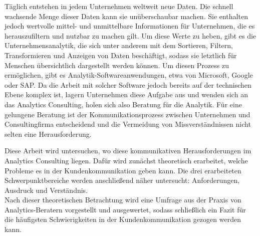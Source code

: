 \documentclass[../main.tex]{subfiles}
\begin{document}
Täglich entstehen in jedem Unternehmen weltweit neue Daten.
Die schnell wachsende Menge dieser Daten kann sie unüberschaubar machen.
Sie enthalten jedoch wertvolle mittel- und unmittelbare Informationen für Unternehmen, die es herauszufiltern und nutzbar zu machen gilt.
Um diese Werte zu heben, gibt es die Unternehmensanalytik, die sich unter anderem mit dem Sortieren, Filtern, Transformieren und Anzeigen von Daten beschäftigt, sodass sie letztlich für Menschen übersichtlich dargestellt werden können.
Um diesen Prozess zu ermöglichen, gibt es Analytik-Softwareanwendungen, etwa von Microsoft, Google oder SAP.
Da die Arbeit mit solcher Software jedoch bereits auf der technischen Ebene komplex ist, lagern Unternehmen diese Aufgabe aus und wenden sich an das Analytics Consulting, holen sich also Beratung für die Analytik.
Für eine gelungene Beratung ist der Kommunikationsprozess zwischen Unternehmen und Consultingfirma entscheidend und die Vermeidung von Missverständnissen nicht selten eine Herausforderung.

Diese Arbeit wird untersuchen, wo diese kommunikativen Herausforderungen im Analytics Consulting liegen.
Dafür wird zunächst theoretisch erarbeitet, welche Probleme es in der Kundenkommunikation geben kann.
Die drei erarbeiteten Schwerpunktbereiche werden anschließend näher untersucht: Anforderungen, Ausdruck und Verständnis.
\\
Nach dieser theoretischen Betrachtung wird eine Umfrage aus der Praxis von Analytics-Beratern vorgestellt und ausgewertet, sodass schließlich ein Fazit für die häufigsten Schwierigkeiten in der Kundenkommunikation gezogen werden kann.
\end{document}
